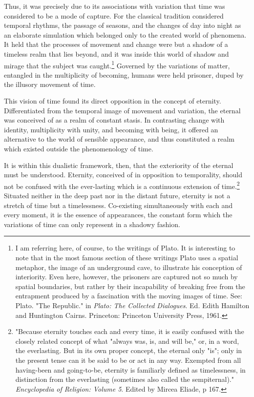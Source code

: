 Thus, it was precisely due to its associations with variation that time
was considered to be a mode of capture. For the classical tradition  considered temporal rhythms, the passage of seasons, and the changes of day into night as an elaborate simulation which belonged only to the created world of phenomena. It held that the processes of movement and change were but a shadow of a timeless realm that lies beyond, and it was inside this world of shadow and mirage that the subject was caught.\footnote{I am referring here, of course, to the writings of Plato. It is interesting to note that in the most famous section of these writings Plato uses a spatial metaphor, the image of an underground cave, to illustrate his conception of interiority. Even here, however, the prisoners are captured not so much by spatial boundaries, but rather by their incapability of breaking free from the entrapment produced by a fascination with the moving images of time. See: Plato. "The Republic." in \textit{Plato: The Collected Dialogues}. Ed. Edith Hamilton and Huntington Cairns. Princeton: Princeton University Press, 1961.} Governed by the variations of matter, entangled in the multiplicity of becoming, humans were held prisoner, duped by the illusory movement of time. 

This vision of time found its direct opposition in the concept of eternity. Differentiated from the temporal image of movement and variation, the eternal was conceived of as a realm of constant stasis. In contrasting change with identity, multiplicity with unity, and becoming with being, it offered an alternative to the world of sensible appearance, and thus constituted a realm which existed outside the phenomenology of time.

It is within this dualistic framework, then, that the exteriority of the eternal must be understood. Eternity, conceived of in opposition to temporality, should not be confused with the ever-lasting which is a continuous extension of time.\footnote{"Because eternity touches each and every time, it is easily confused with the closely related concept of what "always was, is, and will be," or, in a word, the everlasting. But in its own proper concept, the eternal only "is"; only in the present tense can it be said to be or act in any way. Exempted from all having-been and going-to-be, eternity is familiarly defined as timelessness, in distinction from the everlasting (sometimes also called the sempiternal)." \textit{Encyclopedia of Religion: Volume 5}. Edited by Mircea Eliade, p 167.} Situated neither in the deep past nor in the distant future, eternity is not a stretch of time but a timelessness. Co-existing simultaneously with each and every moment, it is the essence of appearances, the constant form which the variations of time can only represent in a shadowy fashion. 


